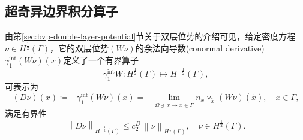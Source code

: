 
\subsection{超奇异边界积分算子}
\label{sec:bvp-hyperbie-operator}

由第\ref{sec:bvp-double-layer-potential}节关于双层位势的介绍可见，给定密度方程$\nu \in H^{\frac{1}{2}}(\Gamma)$，它的双层位势$\left( W \nu \right)$的余法向导数(conormal derivative)$\gamma_{1}^{\text{int}}\left( W \nu \right)(x)$定义了一个有界算子
\begin{equation*}
  \gamma_{1}^{\text{int}} W : H^{\frac{1}{2}}(\Gamma) \mapsto H^{- \frac{1}{2}}(\Gamma),
\end{equation*}
可表示为
\begin{equation}
  \label{eq:bvp-hypersingular-bie-def}
  \left( D \nu \right)(x) \coloneqq - \gamma_{1}^{\text{int}}\left( W \nu \right)(x)
  = - \lim_{\Omega \ni \widetilde{x} \rightarrow x \in \Gamma}
  n_x \triangledown_{\widetilde{x}} \left( W \nu \right)(\widetilde{x}), \quad x \in \Gamma,
\end{equation}
满足有界性
\begin{equation}
  \label{eq:bvp-hypersingular-bie-norm}
  \left\| D \nu \right\|_{H^{-\frac{1}{2}}(\Gamma)}
  \le c_2^{D} \, \left\| \nu \right\|_{H^{\frac{1}{2}}(\Gamma)}, \quad \nu \in H^{\frac{1}{2}}(\Gamma).
\end{equation}

